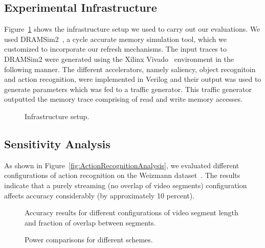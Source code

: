 \subsection{Experimental Infrastructure}
Figure~\ref{fig:experimental-setup} shows the infrastructure setup we used to carry out our evaluations.
We used DRAMSim2~\cite{DRAMsim2}, a cycle accurate memory simulation tool, which we customized to incorporate our refresh mechanisms. 
The input traces to DRAMSim2 were generated using the Xilinx Vivado~\cite{vivado} environment in the following manner.
The different accelerators, namely saliency, object recognitoin and action recognition, were implemented in Verilog and their output was used to generate parameters which was fed to a traffic generator.
This traffic generator outputted the memory trace comprising of read and write memory accesses.

\begin{figure}[ht!]
\centering
{}
\caption{\label{fig:experimental-setup} Infrastructure setup.}
\end{figure}

\subsection{Sensitivity Analysis}
As shown in Figure~\ref{fig:ActionRecognitionAnalysis}, we evaluated different configurations of action recognition on the Weizmann dataset~\cite{Weizmann}. The results indicate that a purely streaming (no overlap of video segments) configuration affects accuracy considerably (by approximately 10 percent).  

\begin{figure}[ht!]
\centering
{}
\caption{\label{fig:ActionRecogntion} Accuracy results for different configurations of video segment length and fraction of overlap between segments.}
\end{figure}

\begin{figure}[ht!]
\centering
{}
\caption{\label{fig:PowerResults} Power comparisons for different schemes.}
\end{figure}

